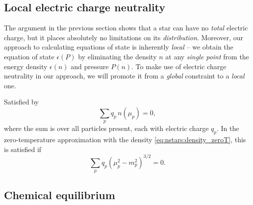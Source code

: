

\subsection{Local electric charge neutrality}



The argument in the previous section shows that a star can have no \emph{total} electric charge, but it places absolutely no limitations on its \emph{distribution}.
Moreover, our approach to calculating equations of state is inherently \emph{local} -- we obtain the equation of state $\epsilon(P)$ by eliminating the density $n$ at any \emph{single point} from the energy density $\epsilon(n)$ and pressure $P(n)$.
To make use of electric charge neutrality in our approach, we will promote it from a \emph{global} constraint to a \emph{local} one.




Satisfied by
\begin{equation}
	\sum_p q_p \, n(\mu_p) = 0 ,
\label{eq:lsm:charge_neutrality}
\end{equation}
where the sum is over all particles present, each with electric charge $q_p$.
In the zero-temperature approximation with the density \eqref{eq:nstars:density_zeroT}, this is satisfied if
\begin{equation}
	\sum_p q_p \left( \mu_p^2 - m_p^2 \right)^{3/2} = 0 .
\end{equation}

\subsection{Chemical equilibrium}


